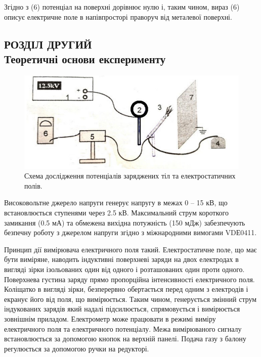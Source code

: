 \documentclass[a4paper,12pt]{article}
\begin{document}
	Згідно з (6) потенціал на поверхні дорівнює нулю і, таким чином, вираз (6) описує електричне поле в напівпросторі праворуч від металевої поверхні.
	
\newpage
	\begin{center}
		\section* {РОЗДІЛ ДРУГИЙ\\Теоретичні основи експерименту}
	\end{center}
	\begin{figure}[h!]
		\begin{center}
			\includegraphics[scale=0.8]{Prt sc/Shema_2.jpg}
		\end{center}
		\caption{Схема дослідження потенціалів заряджених тіл та електростатичних полів.}
		\label{Picture_2}
	\end{figure}

	Високовольтне джерело напруги генерує напругу в межах 0 – 15 кВ, що встановлюється ступенями через 2.5 кВ. Максимальний струм короткого замикання (0.5 мА) та обмежена вихідна потужність (150 мДж) забезпечують безпечну роботу з джерелом напруги згідно з міжнародними вимогами VDЕ0411.
	
	Принцип дії вимірювача електричного поля такий. Електростатичне поле, що має бути виміряне, наводить індуктивні поверхневі заряди на двох електродах в вигляді зірки ізольованих один від одного і розташованих один проти одного. Поверхнева густина заряду прямо пропорційна інтенсивності електричного поля. Коліщатко в вигляді зірки, безперервно обертається перед одним з електродів і екранує його від поля, що вимірюється. Таким чином, генерується змінний струм індукованих зарядів який надалі підсилюється, спрямовується і вимірюється зовнішнім приладом. Електрометр може працювати в режимі виміру електричного поля та електричного потенціалу. Межа вимірюваного сигналу встановлюється за допомогою кнопок на верхній панелі. Подача газу з балону регулюється за допомогою ручки на редукторі.
\end{document}
